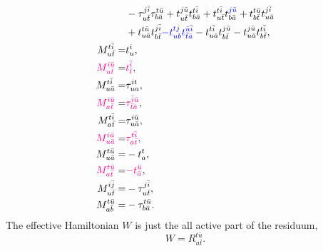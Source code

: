 \documentclass[a4paper,12pt,oneside]{book}
\newcommand{\blue}[1]{{\color{blue} #1}}
\newcommand{\magenta}[1]{{\color{magenta} #1}}
\newcommand{\spa}[1]{{#1}}
\newcommand{\spb}[1]{\bar{#1}}
\begin{document}
\begin{align}
                                     &-\tau^{\spa{j}\spb{i}}_{\spa{u}\spb{t}} \tau^{\spa{t}\spb{u}}_{\spa{b}\bar{a}}
                                      +t^{\spa{j}\spb{u}}_{\spa{u}\spb{t}} t^{\spa{t}\spb{i}}_{\spa{b}\spb{a}}
                                      +t^{\spa{t}\spb{i}}_{\spa{u}\spb{t}} t^{\blue{\spa{j}\spb{u}}}_{\spa{b}\spb{a}} 
                                      +t^{\spa{t}\spb{u}}_{\spa{b}\spb{t}} t^{\spa{j}\spb{i}}_{\spa{u}\spb{a}} \nonumber \\
                                     &+t^{\spa{t}\spb{u}}_{\spa{u}\spb{a}} t^{\spa{j}\spb{i}}_{\spa{b}\spb{t}} 
                                \blue{-t^{\spa{t}\spa{j}}_{\spa{u}\spa{b}} t^{\spb{u}\spb{i}}_{\spb{t}\spb{a}}}
                                      -t^{\spa{t}\spb{i}}_{\spa{u}\spb{a}} t^{\spa{j}\spb{u}}_{\spa{b}\spb{t}} 
                                      -t^{\spa{j}\spb{u}}_{\spa{u}\spb{a}} t^{\spa{t}\spb{i}}_{\spa{b}\spb{t}},\\
M^{\spa{t}\spb{i}}_{\spa{u}\spb{t}} = &t^{\spa{i}}_{\spa{u}},\\
\magenta{M^{\spa{i}\spb{u}}_{\spa{u}\spb{t}}} = &\magenta{t^{\spb{i}}_{\spb{t}}}, \\
M^{\spa{t}\spb{i}}_{\spa{u}\spb{a}} = &\tau^{\spa{i}\spa{t}}_{\spa{u}\spa{a}}, \\
\magenta{M^{\spa{i}\spb{u}}_{\spa{a}\spb{t}}} = &\magenta{\tau^{\spb{i}\spb{u}}_{\spb{t}\spb{a}}}, \\
M^{\spa{t}\spb{i}}_{\spa{a}\spb{t}} = &\tau^{\spa{i}\spb{u}}_{\spa{u}\spb{a}}, \\
\magenta{M^{\spa{i}\spb{u}}_{\spa{u}\spb{a}}} = &\magenta{\tau^{\spa{t}\spb{i}}_{\spa{a}\spb{t}}},\\
M^{\spa{t}\spb{u}}_{\spa{u}\spb{a}} = &-t^{\spa{t}}_{\spa{a}},\\
\magenta{M^{\spa{t}\spb{u}}_{\spa{a}\spb{t}}} = &\magenta{-t^{\spb{u}}_{\spb{a}}},\\
M^{\spa{i}\spb{j}}_{\spa{u}\spb{t}} = &-\tau^{\spa{j}\spb{i}}_{\spa{u}\spb{t}}, \\
M^{\spa{t}\spb{u}}_{\spa{a}\spb{b}} = &-\tau^{\spa{t}\spb{u}}_{\spa{b}\spb{a}}.
\end{align}
The effective Hamiltonian $W$ is just the all active part of the residuum,
\begin{equation}
W = R^{\spa{t}\spb{u}}_{\spa{u}\spb{t}}.
\end{equation}



\end{document}
